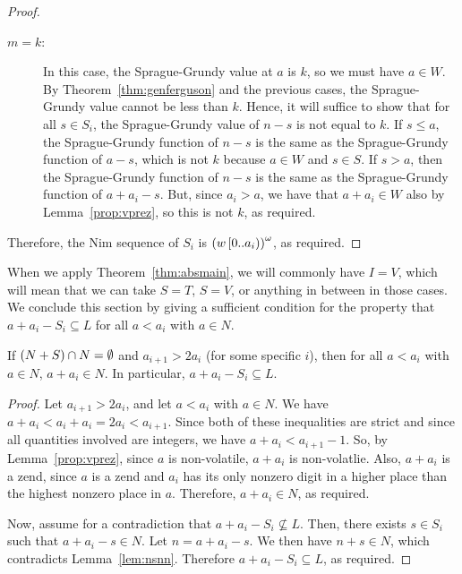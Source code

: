 \documentclass[english,12pt]{article}
\begin{document}
\begin{proof}
\begin{description}
\item[$m=k$:] In this case, the Sprague-Grundy value at $a$ is $k$, so we must have $a\in W$.
By Theorem~\ref{thm:genferguson} and the previous cases, the Sprague-Grundy value cannot be less than $k$.
Hence, it will suffice to show that for all $s\in S_i$, the Sprague-Grundy value of $n-s$ is not equal to $k$.  If $s\leq a$, the Sprague-Grundy function of $n-s$ is the same as the Sprague-Grundy function of $a-s$, which is not $k$ because $a\in W$ and $s\in S$.  If $s>a$, then the Sprague-Grundy function of $n-s$ is the same as the Sprague-Grundy function of $a+a_i-s$.  But, since $a_i>a$, we have that $a+a_i\in W$ also by Lemma~\ref{prop:vprez}, so this is not $k$, as required.
\end{description}
Therefore, the Nim sequence of $S_i$ is $\left(w\left[0..a_i\right)\right)^\omega$, as required.
\end{proof}
When we apply Theorem~\ref{thm:absmain}, we will commonly have $I=V$, which will mean that we can take $S=T$, $S=V$, or anything in between in those cases.  We conclude this section by giving a sufficient condition for the property that $a+a_i-S_i\subseteq L$ for all $a<a_i$ with $a\in N$.
\begin{prop}\label{prop:2aain}
If $\left(N+S\right)\cap N=\emptyset$ and $a_{i+1}>2a_i$ (for some specific $i$), then for all $a<a_i$ with $a\in N$, $a+a_i\in N$.  In particular, $a+a_i-S_i\subseteq L$.
\end{prop}
\begin{proof}
Let $a_{i+1}>2a_i$, and let $a<a_i$ with $a\in N$.  We have $a+a_i<a_i+a_i=2a_i<a_{i+1}$.  Since both of these inequalities are strict and since all quantities involved are integers, we have $a+a_i<a_{i+1}-1$.  So, by Lemma~\ref{prop:vprez}, since $a$ is non-volatile, $a+a_i$ is non-volatlie.  Also, $a+a_i$ is a zend, since $a$ is a zend and $a_i$ has its only nonzero digit in a higher place than the highest nonzero place in $a$.  Therefore, $a+a_i\in N$, as required.

Now, assume for a contradiction that $a+a_i-S_i\not\subseteq L$.  Then, there exists $s\in S_i$ such that $a+a_i-s\in N$.  Let $n=a+a_i-s$.  We then have $n+s\in N$, which contradicts Lemma~\ref{lem:nsnn}.  Therefore $a+a_i-S_i\subseteq L$, as required.
\end{proof}
\end{document}

